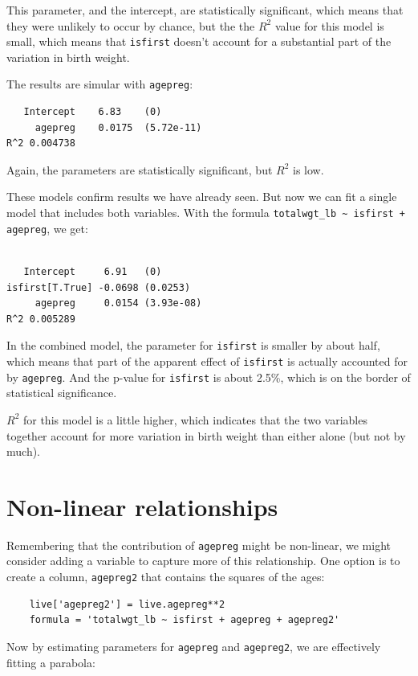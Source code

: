 \documentclass[12pt]{book}
\begin{document}
This parameter, and the intercept, are statistically significant,
which means that they were unlikely to occur by chance, but the
the $R^2$ value for this model is small, which means that
{\tt isfirst} doesn't account for a substantial part of the
variation in birth weight.

The results are simular with {\tt agepreg}:

\begin{verbatim}
   Intercept	6.83	(0)
     agepreg	0.0175	(5.72e-11)
R^2 0.004738
\end{verbatim}

Again, the parameters are statistically significant, but
$R^2$ is low.

These models confirm results we have already seen.  But now we
can fit a single model that includes both variables.  With the
formula \verb"totalwgt_lb ~ isfirst + agepreg", we get:

\begin{verbatim}

   Intercept	 6.91	(0)
isfirst[T.True]	-0.0698	(0.0253)
     agepreg	 0.0154	(3.93e-08)
R^2 0.005289
\end{verbatim}

In the combined model, the parameter for {\tt isfirst} is smaller
by about half, which means that part of the apparent effect of
{\tt isfirst} is actually accounted for by {\tt agepreg}.  And
the p-value for {\tt isfirst} is about 2.5\%, which is on the
border of statistical significance.

$R^2$ for this model is a little higher, which indicates that the
two variables together account for more variation in birth weight
than either alone (but not by much).


\section{Non-linear relationships}

Remembering that the contribution of {\tt agepreg} might be non-linear,
we might consider adding a variable to capture more of this
relationship.  One option is to create a column, {\tt agepreg2}
that contains the squares of the ages:

\begin{verbatim}
    live['agepreg2'] = live.agepreg**2
    formula = 'totalwgt_lb ~ isfirst + agepreg + agepreg2'
\end{verbatim}

Now by estimating parameters for {\tt agepreg} and {\tt agepreg2},
we are effectively fitting a parabola:
\end{document}
